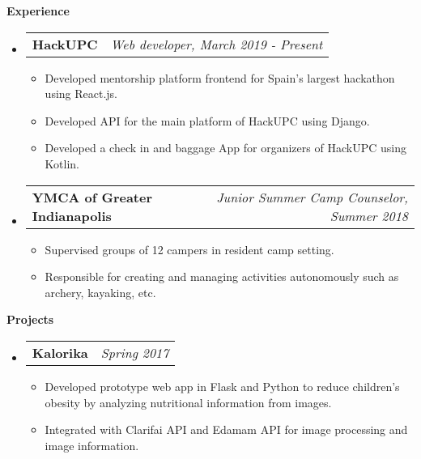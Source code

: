 \documentclass[letterpaper,12pt]{article}
\makeatletter
\newcommand{\resitem}[1]{\item #1 \vspace{-2pt}}
\newcommand{\resheading}[1]{{\large \colorbox{mygrey}{\begin{minipage}{\textwidth}{\textbf{#1 \vphantom{p\^{E}}}}\end{minipage}}}}
\newcommand{\ressubheading}[4]{
\begin{tabular*}{7.0in}{l@{\extracolsep{\fill}}r}
		\textbf{#1} & \textit{#4} \\
\end{tabular*}\vspace{-6pt}}
\makeatother
\begin{document}
\resheading{Experience}
	\begin{itemize}
		\item
			\ressubheading{HackUPC}{Barcelona, Spain}{Web developer}{Web developer, March 2019 - Present}
			\begin{itemize}
				\resitem{Developed mentorship platform frontend for Spain's largest hackathon using React.js.}
				\resitem{Developed API for the main platform of HackUPC using Django.}
				\resitem{Developed a check in and baggage App for organizers of HackUPC using Kotlin.}
			\end{itemize}
		\item
			\ressubheading{YMCA of Greater Indianapolis}{St. Paul, IN}{Junior Summer Camp Counselor}{Junior Summer Camp Counselor, Summer 2018}
			\begin{itemize}
				\resitem{Supervised groups of 12 campers in resident camp setting.}
				\resitem{Responsible for creating and managing activities autonomously such as archery, kayaking, etc.}
			\end{itemize}

	\end{itemize}

\resheading{Projects}
	\begin{itemize}
		\item
			\ressubheading{Kalorika}{Barcelona, Spain}{Student}{Spring 2017}
			\begin{itemize}
				\resitem{Developed prototype web app in Flask and Python to reduce children's obesity by analyzing nutritional information from images.}
				\resitem{Integrated with Clarifai API and Edamam API for image processing and image information.}
			\end{itemize}
	\end{itemize}

\end{document}
